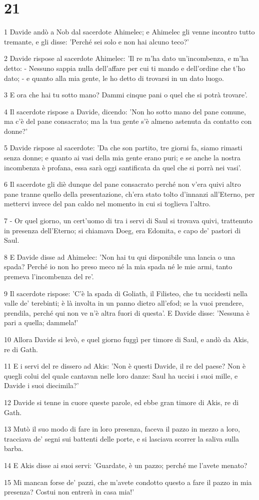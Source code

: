 \chapter{21}

\par 1 Davide andò a Nob dal sacerdote Ahimelec; e Ahimelec gli venne incontro tutto tremante, e gli disse: 'Perché sei solo e non hai alcuno teco?'
\par 2 Davide rispose al sacerdote Ahimelec: 'Il re m'ha dato un'incombenza, e m'ha detto: - Nessuno sappia nulla dell'affare per cui ti mando e dell'ordine che t'ho dato; - e quanto alla mia gente, le ho detto di trovarsi in un dato luogo.
\par 3 E ora che hai tu sotto mano? Dammi cinque pani o quel che si potrà trovare'.
\par 4 Il sacerdote rispose a Davide, dicendo: 'Non ho sotto mano del pane comune, ma c'è del pane consacrato; ma la tua gente s'è almeno astenuta da contatto con donne?'
\par 5 Davide rispose al sacerdote: 'Da che son partito, tre giorni fa, siamo rimasti senza donne; e quanto ai vasi della mia gente erano puri; e se anche la nostra incombenza è profana, essa sarà oggi santificata da quel che si porrà nei vasi'.
\par 6 Il sacerdote gli diè dunque del pane consacrato perché non v'era quivi altro pane tranne quello della presentazione, ch'era stato tolto d'innanzi all'Eterno, per mettervi invece del pan caldo nel momento in cui si toglieva l'altro.
\par 7 - Or quel giorno, un cert'uomo di tra i servi di Saul si trovava quivi, trattenuto in presenza dell'Eterno; si chiamava Doeg, era Edomita, e capo de' pastori di Saul.
\par 8 E Davide disse ad Ahimelec: 'Non hai tu qui disponibile una lancia o una spada? Perché io non ho preso meco né la mia spada né le mie armi, tanto premeva l'incombenza del re'.
\par 9 Il sacerdote rispose: 'C'è la spada di Goliath, il Filisteo, che tu uccidesti nella valle de' terebinti; è là involta in un panno dietro all'efod; se la vuoi prendere, prendila, perché qui non ve n'è altra fuori di questa'. E Davide disse: 'Nessuna è pari a quella; dammela!'
\par 10 Allora Davide si levò, e quel giorno fuggì per timore di Saul, e andò da Akis, re di Gath.
\par 11 E i servi del re dissero ad Akis: 'Non è questi Davide, il re del paese? Non è quegli colui del quale cantavan nelle loro danze: Saul ha uccisi i suoi mille, e Davide i suoi diecimila?'
\par 12 Davide si tenne in cuore queste parole, ed ebbe gran timore di Akis, re di Gath.
\par 13 Mutò il suo modo di fare in loro presenza, faceva il pazzo in mezzo a loro, tracciava de' segni sui battenti delle porte, e si lasciava scorrer la saliva sulla barba.
\par 14 E Akis disse ai suoi servi: 'Guardate, è un pazzo; perché me l'avete menato?
\par 15 Mi mancan forse de' pazzi, che m'avete condotto questo a fare il pazzo in mia presenza? Costui non entrerà in casa mia!'

